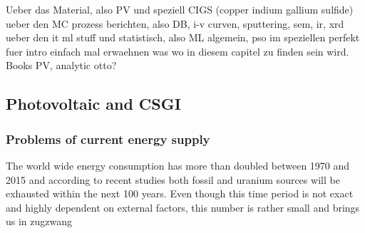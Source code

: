 Ueber das Material, also PV und speziell CIGS (copper indium gallium sulfide) 
ueber den MC prozess berichten, also DB, i-v curven, sputtering, sem, ir, xrd
ueber den it ml stuff und statistisch, also ML algemein, pso im speziellen 
perfekt fuer intro einfach mal erwaehnen was wo in diesem capitel zu finden sein wird. 
Books PV, analytic otto? 
\subsection{Photovoltaic and CSGI}
\iffalse
The grundlage for all pvs is the photovoltaik effect which was entdeckt by Albert Einstein adn for which he got the nobel price. 
The Prinziple is easy: When the energy (E = hv) of the light is \td{large,strong,big,high}er than the binding energy of an electron the electron is ejected with the remaining energy as kinetic energy 
\begin{math}
	E_{kin}=hv - Eb
\end{math}
Different Materials have different binding energies. 
Metals do have in general lower binding energies than covalent bound material and semiconductors do have even lowers E_b. Really? 
That's Silica is in a lot of PVs. 
The next generation of PVs. 
CIGS has in contrast to silicon based PV a direct band gap\td{source and what does that mean?}
duennschicht pv, haben eine effeftivitaet von 7-16\% vs 15-22\% \cite{Mertens2018}
\fi
\subsubsection{Problems of current energy supply}
The world wide energy consumption has more than doubled between 1970 and 2015\cite{BP2017} and according to recent studies both fossil\cite{BGR2017} and uranium sources\cite{Uran2006} 
will be exhausted within the next 100 years. 
Even though this time period is not exact and highly dependent on external factors, this number is rather small and brings us in zugzwang

